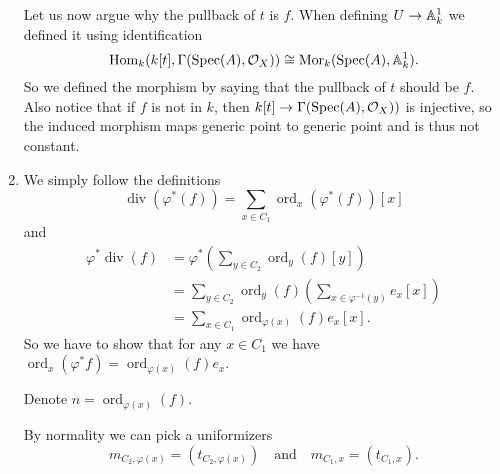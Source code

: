 \begin{exercise}{1}
\begin{enumerate}[label=(\roman*)]
{                Let us now argue why the pullback of $t$ is $f$. When defining
                $U \to \mathbb{A}^1_k$ we defined it using identification
                \begin{equation*}
                    \operatorname{Hom}_k(k[t], \Gamma(\operatorname{Spec}(A), \mathcal{O}_X)) \cong
                    \operatorname{Mor}_k(\operatorname{Spec}(A), \mathbb{A}^1_k).
                \end{equation*}
                So we defined the morphism by saying that the pullback of $t$
                should be $f$.
                Also notice that if $f$ is not in $k$, then $k[t] \to
                \Gamma(\operatorname{Spec}(A), \mathcal{O}_X))$ is injective, so the induced
                morphism maps generic point to generic point and is thus
                not constant.
            }
        \item{
                We simply follow the definitions
                \begin{equation*}
                    \operatorname{div} (\varphi^*(f)) = \sum_{x \in C_1}
                    \operatorname{ord}_x(\varphi^*(f)) [x]
                \end{equation*}
                and 
                \begin{equation*}
                    \begin{split}
                    \varphi^* \operatorname{div} (f)
                        &= \varphi^* \left( \sum_{y \in C_2}
                        \operatorname{ord}_y(f) [y] \right) \\
                        &= \sum_{y \in C_2} \operatorname{ord}_y(f) \left( \sum_{x \in
                        \varphi^{-1}(y)} e_x [x] \right) \\
                        &= \sum_{x \in C_1} \operatorname{ord}_{\varphi(x)}(f) 
                        e_x [x].
                    \end{split}
                \end{equation*}
                So we have to show that for any $x \in C_1$ we have
                $\operatorname{ord}_x(\varphi^* f) =
                \operatorname{ord}_{\varphi(x)}(f) e_x$.

                Denote $n = \operatorname{ord}_{\varphi(x)}(f)$.

                By normality we can pick a uniformizers
                \begin{equation*}
                        m_{C_2, \varphi(x)} = (t_{C_2, \varphi(x)})\quad
                        \text{and}\quad m_{C_1, x} = (t_{C_1, x}).
                \end{equation*}

}
\end{enumerate}
\end{exercise}
